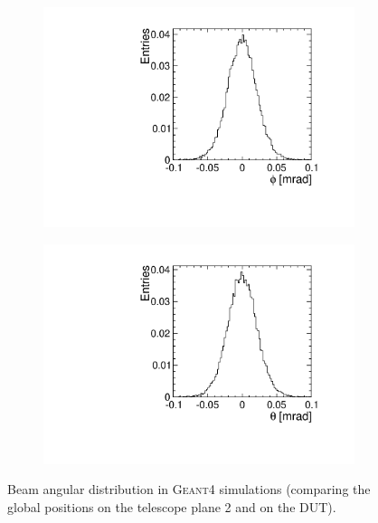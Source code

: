 \begin{figure}[htbp] \centering
  \begin{subfigure}[b]{0.45\textwidth}
    \includegraphics[width=\textwidth]{./figures/Telescope/MC_trackAnglePhi_planes_302_100.pdf}
    \caption{}
  \end{subfigure}\hfill
  \begin{subfigure}[b]{0.45\textwidth}
    \includegraphics[width=\textwidth]{./figures/Telescope/MC_trackAngleTheta_planes_302_100.pdf}
    \caption{}
  \end{subfigure}
  \caption{Beam angular distribution in \textsc{Geant4} simulations
    (comparing the global positions on the telescope plane 2 and on
    the DUT).}
  \label{fig:MCbeamAngleDistr}
\end{figure}


